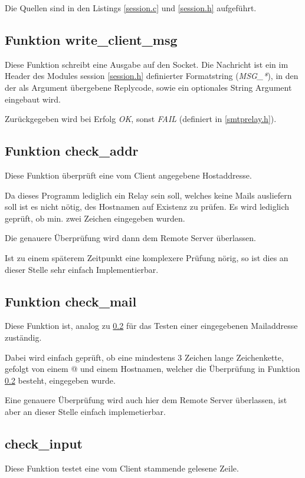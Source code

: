 \documentclass[pdftex,final,a4paper,10pt,notitlepage,halfparskip]{scrreprt}
\begin{document}
Die Quellen sind in den Listings \ref{session.c} und \ref{session.h} aufgeführt.

\subsection{Funktion write\_client\_msg}\label{fn:write_client_msg}
Diese Funktion schreibt eine Ausgabe auf den Socket. Die Nachricht ist ein im Header des Modules session \ref{session.h} definierter Formatstring (\textit{MSG\_*}), in den der als Argument übergebene Replycode, sowie ein optionales String Argument eingebaut wird.

Zurückgegeben wird bei Erfolg \textit{OK}, sonst \textit{FAIL} (definiert in \ref{smtprelay.h}).

\subsection{Funktion check\_addr}\label{fn:check_addr}
Diese Funktion überprüft eine vom Client angegebene Hostaddresse. 

Da dieses Programm lediglich ein Relay sein soll, welches keine Mails ausliefern soll ist es nicht nötig, des Hostnamen auf Existenz zu prüfen. Es wird lediglich geprüft, ob min. zwei Zeichen eingegeben wurden. 

Die genauere Überprüfung wird dann dem Remote Server überlassen.

Ist zu einem späterem Zeitpunkt eine komplexere Prüfung nörig, so ist dies an dieser Stelle sehr einfach Implementierbar.

\subsection{Funktion check\_mail}\label{fn:check_mail}
Diese Funktion ist, analog zu \ref{fn:check_addr} für das Testen einer eingegebenen Mailaddresse zuständig. 

Dabei wird einfach geprüft, ob eine mindestens 3 Zeichen lange Zeichenkette, gefolgt von einem @ und einem Hostnamen, welcher die Überprüfung in Funktion \ref{fn:check_addr} besteht, eingegeben wurde.

Eine genauere Überprüfung wird auch hier dem Remote Server überlassen, ist aber an dieser Stelle einfach implemetierbar.

\subsection{check\_input}\label{check_input}
Diese Funktion testet eine vom Client stammende gelesene Zeile.
\end{document}

